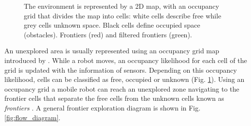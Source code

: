 \begin{figure}[t!]
	\centering
	\caption {The environment is represented by a 2D map, with an occupancy grid that divides the map into cells: white cells describe free while grey cells unknown space. Black cells define occupied space (obstacles). Frontiers (red) and filtered frontiers (green).}
	\label{fig:environment}
\end{figure}
An unexplored area is usually represented using an occupancy grid map introduced by \cite{Moravec}. While a robot moves, an occupancy likelihood for each cell of the grid is updated with the information of sensors. Depending on this occupancy likelihood, cells can be classified as free, occupied or unknown (Fig. \ref{fig:environment}). Using an occupancy grid a mobile robot can reach an unexplored zone navigating to the frontier cells that separate the free cells from the unknown cells known as \textit{frontiers} \cite{Yamauchi1997}. A general frontier exploration diagram is shown in Fig. \ref{fig:flow_diagram}.

